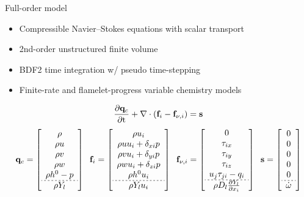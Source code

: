 \documentclass[]{beamer}
\begin{document}
\begin{frame}{Full-order model}
    \begin{itemize}
		\item Compressible Navier--Stokes equations with scalar transport
		\item 2nd-order unstructured finite volume
		\item BDF2 time integration w/ pseudo time-stepping
		\item Finite-rate and flamelet-progress variable chemistry models
	\end{itemize}
	\begin{equation*}
		\frac{\partial \mathbf{q}_{c}}{\partial \text{t}} + \nabla \cdot (\mathbf{f}_{i} - \mathbf{f}_{\nu,i}) = \mathbf{s}
	\end{equation*}
	\scriptsize
	\def\arraystretch{2}
	\begin{equation*}
		\consVec = \left[
		\begin{array}{c}
		\rho \\ \rho u \\ \rho v \\ \rho w \\ \rho h^0 - p \\ \hdashline[2pt/2pt] \rho Y_{\specIdx} \\
		\end{array}
		\right]  \; \;
		\invFluxDir = \left[
		\begin{array}{c}
		\rho u_i \\  \rho uu_i + \delta_{xi} p \\ \rho vu_i + \delta_{yi} p \\ \rho wu_i + \delta_{zi} p \\ \rho h^0 u_i \\ \hdashline[2pt/2pt] \rho Y_{\specIdx} u_i 
		\end{array}
		\right]  \; \;
		\viscFluxDir = \left[
		\begin{array}{c}
		0 \\ \tau_{ix} \\ \tau_{iy} \\ \tau_{iz} \\ u_j \tau_{ji} - q_i \\ \hdashline[2pt/2pt] \rho D_\specIdx  \pde{Y_{\specIdx}}{x_i}
		\end{array}
		\right]  \; \;
		\mathbf{s} = \left[
		\begin{array}{c}
		0 \\ 0 \\ 0 \\ 0 \\ 0 \\ \hdashline[2pt/2pt] \dot{\omega}
		\end{array} \right]
	\end{equation*}
	\normalsize
\end{frame}
\end{document}
